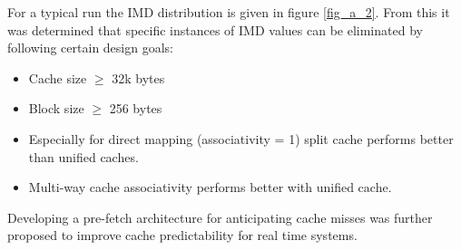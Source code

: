 \documentclass[conference]{IEEEtran}
\begin{document}
    For a typical run the IMD distribution is given in figure \ref{fig_a_2}. From this it was determined that specific instances of IMD values can be eliminated by following certain design goals:
    \begin{itemize}
        \item Cache size $\geqslant$ 32k bytes
        \item Block size $\geqslant$ 256 bytes
        \item Especially for direct mapping (associativity = 1) split cache performs better than unified caches.
        \item Multi-way cache associativity performs better with unified cache.
    \end{itemize}

    Developing a pre-fetch architecture for anticipating cache misses was further proposed to improve cache predictability for real time systems.
    
\end{document}
